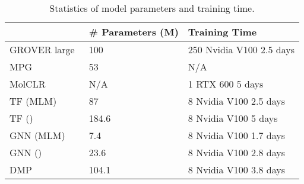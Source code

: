 \documentclass{article}
\begin{document}
\begin{table}[!htbp]
\centering
\small
\begin{tabular}{lll}
\toprule
& \# Parameters (M) & Training Time \\
\midrule
GROVER large~\cite{rong2020self} & 100  & 250 Nvidia V100  2.5 days \\
MPG & 53 & N/A \\
MolCLR~\cite{wang2021molclr} & N/A & 1 RTX 600  5 days \\
TF (MLM) & 87 & 8 Nvidia V100  2.5 days \\
TF () & 184.6 & 8 Nvidia V100  5 days \\
GNN (MLM) & 7.4 & 8 Nvidia V100  1.7 days \\
GNN () & 23.6 & 8 Nvidia V100  2.8 days \\
DMP & 104.1 & 8 Nvidia V100  3.8 days\\
\bottomrule
\end{tabular}
\caption{Statistics of model parameters and training time.}
\label{tab:summary_modelpram_time}
\end{table}
\end{document}
